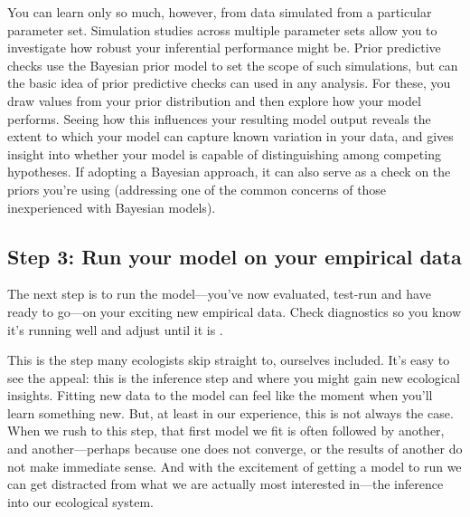 \documentclass[11pt]{article}
\begin{document}
You can learn only so much, however, from data simulated from a particular parameter set. Simulation studies across multiple parameter sets allow you to investigate how robust your inferential performance might be. Prior predictive checks \citep{betanprior,winter2023} use the Bayesian prior model to set the scope of such simulations, but can the basic idea of prior predictive checks can used in any analysis. For these, you draw values from your prior distribution and then explore how your model performs. Seeing how this influences your resulting model output 
reveals the extent to which your model can capture known variation in your data, and gives insight into whether your model is capable of distinguishing among competing hypotheses. If adopting a Bayesian approach, it can also serve as a check on the priors you're using (addressing one of the common concerns of those inexperienced with Bayesian models). 


 \subsection*{Step 3: Run your model on your empirical data} 
 
The next step is to run the model---you've now evaluated, test-run and have ready to go---on your exciting new empirical data. Check diagnostics so you know it's running well and adjust until it is \citep[this includes a suite of convergence and efficiency metrics that are well-discussed elsewhere,][]{betanworkflow,gelman2020bayesian,vandeschoot2021,gabryvis}. %
 
This is the step many ecologists skip straight to, ourselves included. It's easy to see the appeal: this is the inference step and where you might gain new ecological insights. Fitting new data to the model can feel like the moment when you'll learn something new. But, at least in our experience, this is not always the case. When we rush to this step, that first model we fit is often followed by another, and another---perhaps because one does not converge, or the results of another do not make immediate sense. And with the excitement of getting a model to run we can get distracted from what we are actually most interested in---the inference into our ecological system. %
\end{document}
